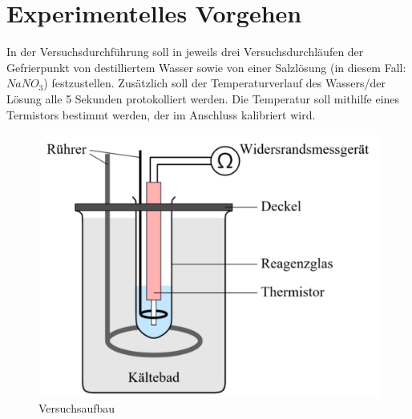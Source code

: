 \section{Experimentelles Vorgehen}
In der Versuchsdurchführung soll in jeweils drei Versuchsdurchläufen der Gefrierpunkt von destilliertem Wasser sowie von einer Salzlösung (in diesem Fall: $NaNO_3$) festzustellen. Zusätzlich soll der Temperaturverlauf des Wassers/der Lösung alle 5 Sekunden protokolliert werden. Die Temperatur soll mithilfe eines Termistors bestimmt werden, der im Anschluss kalibriert wird. 

\begin{center}
\begin{figure}
\centering
\includegraphics[scale=0.8]{Bilder/Versuchsaufbau.png}
\caption{Versuchsaufbau}
\label{fig:aufbau}
\end{figure}
\end{center}
